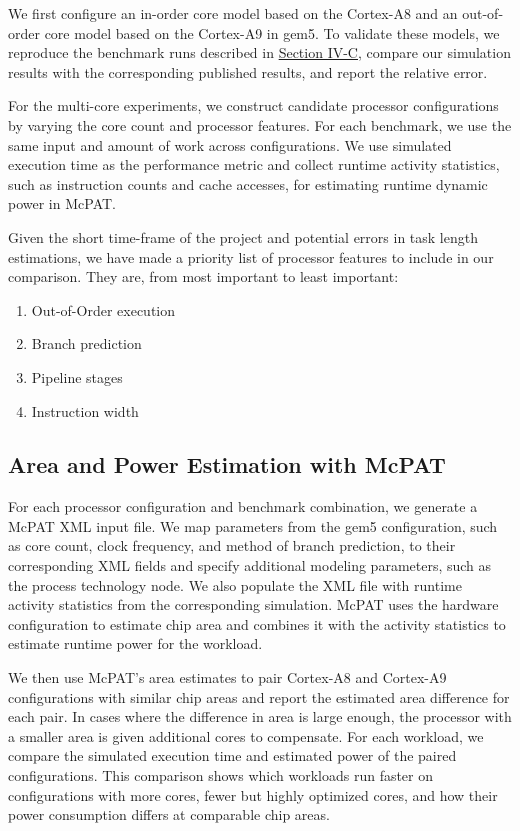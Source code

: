 \documentclass[conference,9pt]{IEEEtran}
\begin{document}
We first configure an in-order core model based on the Cortex-A8 and an out-of-order core model based on the Cortex-A9 in gem5. To validate these models, we reproduce the benchmark runs described in \hyperref[sec:bench]{Section IV-C}, compare our simulation results with the corresponding published results, and report the relative error.

For the multi-core experiments, we construct candidate processor configurations by varying the core count and processor features. For each benchmark, we use the same input and amount of work across configurations. We use simulated execution time as the performance metric and collect runtime activity statistics, such as instruction counts and cache accesses, for estimating runtime dynamic power in McPAT.

Given the short time-frame of the project and potential errors in task length estimations, we have made a priority list of processor features to include in our comparison. They are, from most important to least important:
\begin{enumerate}
    \item Out-of-Order execution
    \item Branch prediction
    \item Pipeline stages
    \item Instruction width
\end{enumerate}

\subsection{Area and Power Estimation with McPAT}

For each processor configuration and benchmark combination, we generate a McPAT XML input file. We map parameters from the gem5 configuration, such as core count, clock frequency, and method of branch prediction, to their corresponding XML fields and specify additional modeling parameters, such as the process technology node. We also populate the XML file with runtime activity statistics from the corresponding simulation. McPAT uses the hardware configuration to estimate chip area and combines it with the activity statistics to estimate runtime power for the workload.

We then use McPAT's area estimates to pair Cortex-A8 and Cortex-A9 configurations with similar chip areas and report the estimated area difference for each pair. In cases where the difference in area is large enough, the processor with a smaller area is given additional cores to compensate. For each workload, we compare the simulated execution time and estimated power of the paired configurations. This comparison shows which workloads run faster on configurations with more cores, fewer but highly optimized cores, and how their power consumption differs at comparable chip areas. 
\end{document}
